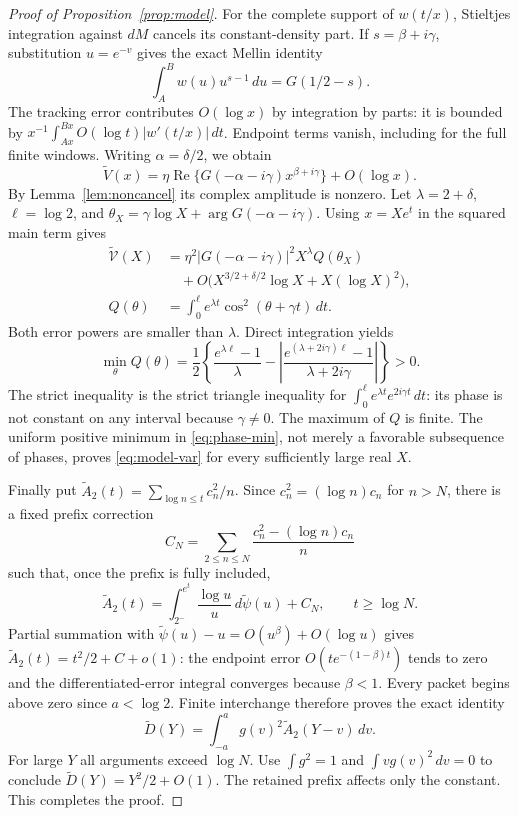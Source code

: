 \documentclass[11pt]{article}
\theoremstyle{remark}
\newcommand{\dd}{\,d}
\newcommand{\Rea}{\operatorname{Re}}
\numberwithin{equation}{section}
\begin{document}
\begin{proof}[Proof of Proposition~\ref{prop:model}]
For the complete support of $w(t/x)$, Stieltjes integration against
$dM$ cancels its constant-density part. If $s=\beta+i\gamma$,
substitution $u=e^{-v}$ gives the exact Mellin identity
\[
\int_A^B w(u)u^{s-1}\dd u=G(1/2-s).
\]
The tracking error contributes $O(\log x)$ by integration by parts:
it is bounded by
$x^{-1}\int_{Ax}^{Bx}O(\log t)|w'(t/x)|\dd t$.
Endpoint terms vanish, including for the full finite windows.
Writing $\alpha=\delta/2$, we obtain
\begin{equation}\label{eq:model-response}
\widetilde V(x)=\eta\Rea\{G(-\alpha-i\gamma)x^{\beta+i\gamma}\}
+O(\log x).
\end{equation}
By Lemma~\ref{lem:noncancel} its complex amplitude is nonzero.
Let $\lambda=2+\delta$, $\ell=\log2$, and
$\theta_X=\gamma\log X+\arg G(-\alpha-i\gamma)$.
Using $x=Xe^t$ in the squared main term gives
\begin{equation}\label{eq:phase}
\begin{split}
\widetilde{\mathcal V}(X)
&=\eta^2|G(-\alpha-i\gamma)|^2X^\lambda Q(\theta_X)\\
&\quad+O\bigl(X^{3/2+\delta/2}\log X+X(\log X)^2\bigr),\\
Q(\theta)&=\int_0^\ell e^{\lambda t}\cos^2(\theta+\gamma t)\dd t.
\end{split}
\end{equation}
Both error powers are smaller than $\lambda$. Direct integration yields
\begin{equation}\label{eq:phase-min}
\min_\theta Q(\theta)=\frac12\left\{
\frac{e^{\lambda\ell}-1}{\lambda}
-\left|\frac{e^{(\lambda+2i\gamma)\ell}-1}{\lambda+2i\gamma}\right|
\right\}>0.
\end{equation}
The strict inequality is the strict triangle inequality for
$\int_0^\ell e^{\lambda t}e^{2i\gamma t}\dd t$: its phase is not
constant on any interval because $\gamma\ne0$.
The maximum of $Q$ is finite. The uniform positive minimum in
\eqref{eq:phase-min}, not merely a favorable subsequence of phases,
proves \eqref{eq:model-var} for every sufficiently large real $X$.

Finally put $\widetilde A_2(t)=\sum_{\log n\le t}c_n^2/n$.
Since $c_n^2=(\log n)c_n$ for $n>N$, there is a fixed prefix correction
\[
C_N=\sum_{2\le n\le N}\frac{c_n^2-(\log n)c_n}{n}
\]
such that, once the prefix is fully included,
\begin{equation}\label{eq:diagonal-prefix}
\widetilde A_2(t)=\int_{2^-}^{e^t}\frac{\log u}{u}\dd\widetilde\psi(u)
+C_N,\qquad t\ge\log N.
\end{equation}
Partial summation with
$\widetilde\psi(u)-u=O(u^\beta)+O(\log u)$ gives
$\widetilde A_2(t)=t^2/2+C+o(1)$: the endpoint error
$O(t e^{-(1-\beta)t})$ tends to zero and the differentiated-error
integral converges because $\beta<1$.
Every packet begins above zero since $a<\log2$. Finite interchange
therefore proves the exact identity
\[
\widetilde D(Y)=\int_{-a}^a g(v)^2\widetilde A_2(Y-v)\dd v.
\]
For large $Y$ all arguments exceed $\log N$.
Use $\int g^2=1$ and $\int v g(v)^2\dd v=0$ to conclude
$\widetilde D(Y)=Y^2/2+O(1)$. The retained prefix affects only the
constant. This completes the proof.
\end{proof}
\end{document}
